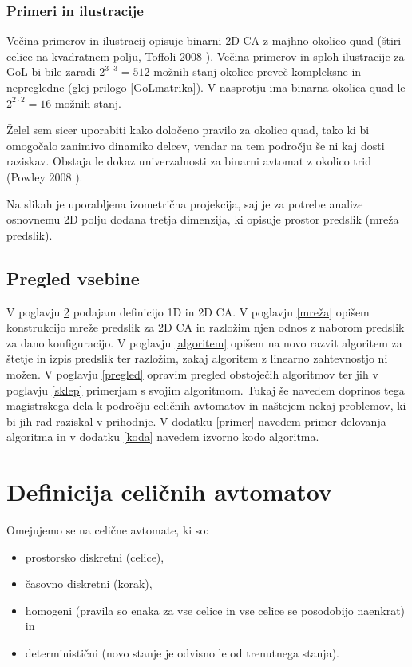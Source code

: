 \documentclass[12pt,a4paper,openany,twoside]{book}
\begin{document}
\subsection{Primeri in ilustracije}

Večina primerov in ilustracij opisuje binarni 2D CA z majhno okolico quad
(štiri celice na kvadratnem polju, Toffoli 2008 \cite{Toffoli2008}).
Večina primerov in sploh ilustracije za GoL bi bile zaradi
\(2^{3 \cdot 3}=512\) možnih stanj okolice preveč kompleksne in nepregledne (glej prilogo \ref{GoLmatrika}).
V nasprotju ima binarna okolica quad le \(2^{2 \cdot 2}=16\) možnih stanj.

Želel sem sicer uporabiti kako določeno pravilo za okolico quad,
tako ki bi omogočalo zanimivo dinamiko delcev, vendar na tem področju še ni kaj dosti raziskav.
Obstaja le dokaz univerzalnosti za binarni avtomat z okolico trid (Powley 2008 \cite{Powley2008}).

Na slikah je uporabljena izometrična projekcija,
saj je za potrebe analize osnovnemu 2D polju dodana tretja dimenzija,
ki opisuje prostor predslik (mreža predslik).

\section{Pregled vsebine}

V poglavju \ref{definicija} podajam definicijo 1D in 2D CA.
V poglavju \ref{mreža} opišem konstrukcijo mreže predslik za 2D CA
in razložim njen odnos z naborom predslik za dano konfiguracijo.
V poglavju \ref{algoritem} opišem na novo razvit algoritem za štetje in izpis predslik
ter razložim, zakaj algoritem z linearno zahtevnostjo ni možen.
V poglavju \ref{pregled} opravim pregled obstoječih algoritmov
ter jih v poglavju \ref{sklep} primerjam s svojim algoritmom.
Tukaj še navedem doprinos tega magistrskega dela k področju celičnih avtomatov
in naštejem nekaj problemov, ki bi jih rad raziskal v prihodnje.
V dodatku \ref{primer} navedem primer delovanja algoritma in
v dodatku \ref{koda} navedem izvorno kodo algoritma.




\chapter{Definicija celičnih avtomatov}
\label{definicija}

Omejujemo se na celične avtomate, ki so:
\begin{itemize}[noitemsep,nolistsep]
 \item prostorsko diskretni (celice),
 \item časovno diskretni (korak),
 \item homogeni (pravila so enaka za vse celice in vse celice se posodobijo naenkrat) in
 \item deterministični (novo stanje je odvisno le od trenutnega stanja).
\end{itemize}
\end{document}
